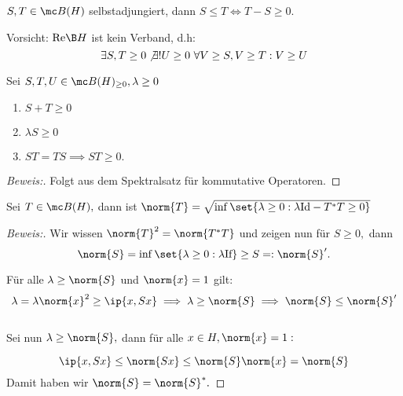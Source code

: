 
\begin{definition} $S, T \in \mc B(H)$ selbstadjungiert, dann $S \leq T \iff T - S \geq 0.$

\begin{rem} Vorsicht: $\text{Re} \B H$ ist kein Verband, d.h: \[\exists S, T \geq 0  \not \exists ! U \geq 0 \  \forall V \geq S, V \geq T: V \geq U\]
\end{rem}

\end{definition}


\begin{theorem} Sei $S, T, U \in \mc B(H)_{\geq 0}, \lambda \geq 0$

\begin{enumerate}
	
	\item $S + T \geq 0$
	
	\item $\lambda S \geq 0$
	
	\item $ST = TS \implies ST \geq 0.$
	
\end{enumerate}


\begin{proof}[Beweis:] Folgt aus dem Spektralsatz für kommutative Operatoren.
	
\end{proof}

\end{theorem}


\begin{theorem} Sei $T \in \mc B(H),$ dann ist $\norm{T} = \sqrt{\inf{\set{\lambda \geq 0: \lambda \text{Id} - T^*T \geq 0}}}$

\begin{proof}[Beweis:] Wir wissen $\norm{T}^2 = \norm{T^*T}$ und zeigen nun für $S \geq 0,$ dann \[\norm{S} = \inf \set{\lambda \geq 0: \lambda \text{If}} \geq S =: \norm{S}'.\]
	
Für alle $\lambda \geq \norm{S}$ und $\norm{x} = 1$ gilt: \[\lambda = \lambda \norm{x}^2 \geq \ip{x, Sx} \implies \lambda \geq \norm{S} \implies \norm{S} \leq \norm{S}'\] \\
	
Sei nun $\lambda \geq \norm{S},$ dann für alle $x \in H, \norm{x} = 1:$
	
\[\ip{x, Sx} \leq \norm{Sx} \leq \norm{S}\norm{x} = \norm{S}\] Damit haben wir $\norm{S} = \norm{S}^*.$
	
\end{proof}
	
\end{theorem}


